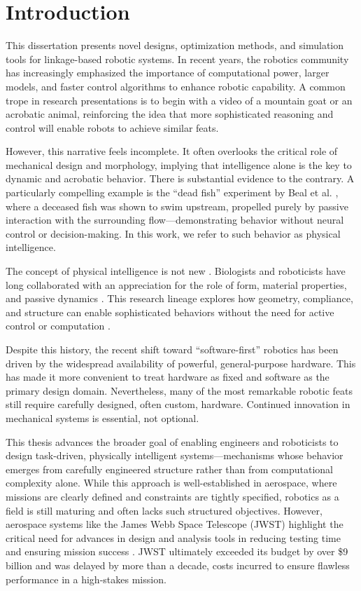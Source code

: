 \chapter{Introduction}

This dissertation presents novel designs, optimization methods, and simulation tools for linkage-based robotic systems. In recent years, the robotics community has increasingly emphasized the importance of computational power, larger models, and faster control algorithms to enhance robotic capability. A common trope in research presentations is to begin with a video of a mountain goat or an acrobatic animal, reinforcing the idea that more sophisticated reasoning and control will enable robots to achieve similar feats.

However, this narrative feels incomplete. It often overlooks the critical role of mechanical design and morphology, implying that intelligence alone is the key to dynamic and acrobatic behavior. There is substantial evidence to the contrary. A particularly compelling example is the “dead fish” experiment by Beal et al. \cite{BEAL_HOVER_TRIANTAFYLLOU_LIAO_LAUDER_2006}, where a deceased fish was shown to swim upstream, propelled purely by passive interaction with the surrounding flow—demonstrating behavior without neural control or decision-making. In this work, we refer to such behavior as physical intelligence.

The concept of physical intelligence is not new \cite{ghazi-zahedi_editorial_2021, Pfeifer2007}. Biologists and roboticists have long collaborated with an appreciation for the role of form, material properties, and passive dynamics \cite{Koditschek1999TemplatesLand, McGeer1990}. This research lineage explores how geometry, compliance, and structure can enable sophisticated behaviors without the need for active control or computation \cite{De2020Template-basedFlapping, Collins2001, Collins2004}.

Despite this history, the recent shift toward “software-first” robotics has been driven by the widespread availability of powerful, general-purpose hardware. This has made it more convenient to treat hardware as fixed and software as the primary design domain. Nevertheless, many of the most remarkable robotic feats still require carefully designed, often custom, hardware. Continued innovation in mechanical systems is essential, not optional.

This thesis advances the broader goal of enabling engineers and roboticists to design task-driven, physically intelligent systems—mechanisms whose behavior emerges from carefully engineered structure rather than from computational complexity alone. While this approach is well-established in aerospace, where missions are clearly defined and constraints are tightly specified, robotics as a field is still maturing and often lacks such structured objectives. However, aerospace systems like the James Webb Space Telescope (JWST) highlight the critical need for advances in design and analysis tools in reducing testing time and ensuring mission success \cite{lightsey_james_2012}. JWST ultimately exceeded its budget by over \$9 billion and was delayed by more than a decade, costs incurred to ensure flawless performance in a high-stakes mission.

